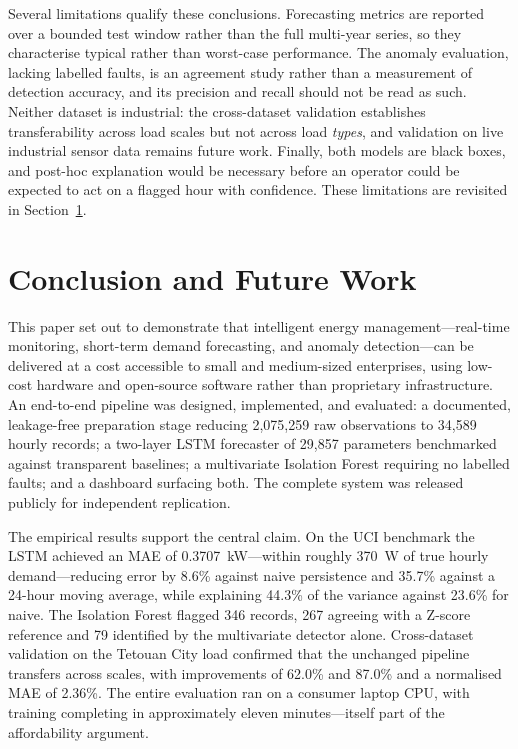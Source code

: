 \documentclass[conference]{IEEEtran}
\begin{document}
Several limitations qualify these conclusions. Forecasting metrics are reported
over a bounded test window rather than the full multi-year series, so they
characterise typical rather than worst-case performance. The anomaly
evaluation, lacking labelled faults, is an agreement study rather than a
measurement of detection accuracy, and its precision and recall should not be
read as such. Neither dataset is industrial: the cross-dataset validation
establishes transferability across load scales but not across load
\emph{types}, and validation on live industrial sensor data remains future
work. Finally, both models are black boxes, and post-hoc explanation would be
necessary before an operator could be expected to act on a flagged hour with
confidence. These limitations are revisited in Section~\ref{sec:conclusion}.
\section{Conclusion and Future Work}\label{sec:conclusion}
This paper set out to demonstrate that intelligent energy
management---real-time monitoring, short-term demand forecasting, and anomaly
detection---can be delivered at a cost accessible to small and medium-sized
enterprises, using low-cost hardware and open-source software rather than
proprietary infrastructure. An end-to-end pipeline was designed, implemented,
and evaluated: a documented, leakage-free preparation stage reducing
2{,}075{,}259 raw observations to 34{,}589 hourly records; a two-layer LSTM
forecaster of 29{,}857 parameters benchmarked against transparent baselines; a
multivariate Isolation Forest requiring no labelled faults; and a dashboard
surfacing both. The complete system was released publicly for independent
replication.

The empirical results support the central claim. On the UCI benchmark the LSTM
achieved an MAE of 0.3707~kW---within roughly 370~W of true hourly
demand---reducing error by 8.6\% against naive persistence and 35.7\% against a
24-hour moving average, while explaining 44.3\% of the variance against 23.6\%
for naive. The Isolation Forest flagged 346 records, 267 agreeing with a
Z-score reference and 79 identified by the multivariate detector alone.
Cross-dataset validation on the Tetouan City load confirmed that the unchanged
pipeline transfers across scales, with improvements of 62.0\% and 87.0\% and a
normalised MAE of 2.36\%. The entire evaluation ran on a consumer laptop CPU,
with training completing in approximately eleven minutes---itself part of the
affordability argument.
\end{document}
